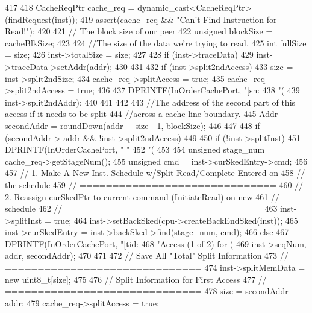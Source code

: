 \begin{DoxyCode}
417 {
418     CacheReqPtr cache_req = dynamic_cast<CacheReqPtr>(findRequest(inst));
419     assert(cache_req && "Can't Find Instruction for Read!");
420 
421     // The block size of our peer
422     unsigned blockSize = cacheBlkSize;
423 
424     //The size of the data we're trying to read.
425     int fullSize = size;
426     inst->totalSize = size;
427 
428     if (inst->traceData) {
429         inst->traceData->setAddr(addr);
430     }
431 
432     if (inst->split2ndAccess) {     
433         size = inst->split2ndSize;
434         cache_req->splitAccess = true;        
435         cache_req->split2ndAccess = true;
436         
437         DPRINTF(InOrderCachePort, "[sn:%
438                 "(%
439                 inst->split2ndAddr);
440     }  
441     
442 
443     //The address of the second part of this access if it needs to be split
444     //across a cache line boundary.
445     Addr secondAddr = roundDown(addr + size - 1, blockSize);
446 
447     
448     if (secondAddr > addr && !inst->split2ndAccess) {
449 
450         if (!inst->splitInst) {
451             DPRINTF(InOrderCachePort, "%
      "
452                     "(%
453 
454             unsigned stage_num = cache_req->getStageNum();
455             unsigned cmd = inst->curSkedEntry->cmd;
456 
457             // 1. Make A New Inst. Schedule w/Split Read/Complete Entered on
458             // the schedule
459             // ==============================
460             // 2. Reassign curSkedPtr to current command (InitiateRead) on new
461             // schedule
462             // ==============================
463             inst->splitInst = true;
464             inst->setBackSked(cpu->createBackEndSked(inst));
465             inst->curSkedEntry = inst->backSked->find(stage_num, cmd);
466         } else {
467             DPRINTF(InOrderCachePort, "[tid:%
468                     "Access (1 of 2) for (%
469                     inst->seqNum, addr, secondAddr);
470         }
471 
472         // Save All "Total" Split Information
473         // ==============================
474         inst->splitMemData = new uint8_t[size];
475 
476         // Split Information for First Access
477         // ==============================
478         size = secondAddr - addr;
479         cache_req->splitAccess = true;
}}
\end{DoxyCode}
